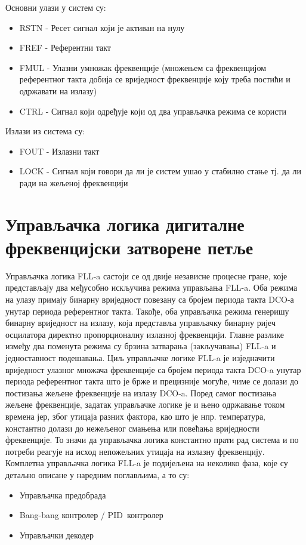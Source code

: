 \documentclass[master]{finthesis}
\def \FLL  {FLL} %
\def \DCO  {DCO} %
\def \PID  {PID} %
\begin{document}


Основни улази у систем су:
\begin{itemize}
	\item RSTN - Ресет сигнал који је активан на нулу
	\item FREF - Референтни такт
	\item FMUL - Улазни умножак фреквенције (множењем са фреквенцијом референтног такта добија се вриједност фреквенције коју треба постићи и одржавати на излазу)
	\item CTRL - Сигнал који одређује који од два управљачка режима се користи
\end{itemize}
Излази из система су:
\begin{itemize}
	\item FOUT - Излазни такт
	\item LOCK - Сигнал који говори да ли је систем ушао у стабилно стање тј. да ли ради на жељеној фреквенцији
\end{itemize}

\section{Управљачка логика дигиталне фреквенцијски затворене петље} \label{section:ctrl}
Управљачка логика \FLL-a састоји се од двије независне процесне гране, које представљају два међусобно искључива режима управљања \FLL-a. Оба режима на улазу примају бинарну вриједност повезану са бројем периода такта \DCO-а унутар периода референтног такта. Такође, оба управљачка режима генеришу бинарну вриједност на излазу, која представља управљачку бинарну ријеч осцилатора директно пропорционалну излазној фреквенцији. Главне разлике између два поменута режима су брзина затварања (закључавања) \FLL-a и једноставност подешавања. Циљ управљачке логике \FLL-a је изједначити вриједност улазног множача фреквенције са бројем периода такта \DCO-a унутар периода референтног такта што је брже и прецизније могуће, чиме се долази до постизања жељене фреквенције на излазу \DCO-a. Поред самог постизања жељене фреквенције, задатак управљачке логике је и њено одржавање током времена јер, због утицаја разних фактора, као што је нпр. температура, константно долази до нежељеног смањења или повећања вриједности фреквенције. То значи да управљачка логика константно прати рад система и по потреби реагује на исход непожељних утицаја на излазну фреквенцију. Комплетна управљачка логика \FLL-a је подијељена на неколико фаза, које су детаљно описане у наредним поглављима, а то су:
\begin{itemize}
	\item Управљачка предобрада
	\item Bang-bang контролер / \PID\ контролер
	\item Управљачки декодер
\end{itemize}
\end{document}
